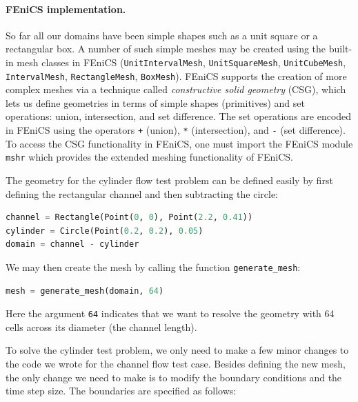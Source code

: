 \documentclass[graybox,envcountchap,sectrefs,final]{svmonodo}
\begin{document}
\paragraph{FEniCS implementation.}
So far all our domains have been simple shapes such as a unit square or
a rectangular box. A number of such simple meshes may be created
using the built-in mesh classes in FEniCS
(\texttt{UnitIntervalMesh},
\texttt{UnitSquareMesh},
\texttt{UnitCubeMesh},
\texttt{IntervalMesh},
\texttt{RectangleMesh},
\texttt{BoxMesh}).
FEniCS supports the creation of more complex meshes via a technique
called \emph{constructive solid geometry} (CSG), which lets us define
geometries in terms of simple shapes (primitives) and set operations:
union, intersection, and set difference. The set operations are
encoded in FEniCS using the operators \texttt{+} (union), \texttt{*} (intersection),
and \texttt{-} (set difference). To access the CSG functionality in FEniCS,
one must import the FEniCS module \texttt{mshr} which provides the
extended meshing functionality of FEniCS.


The geometry for the cylinder flow test problem can be defined easily
by first defining the rectangular channel and then subtracting the
circle:

\begin{lstlisting}[language=Python,style=graycolor]
channel = Rectangle(Point(0, 0), Point(2.2, 0.41))
cylinder = Circle(Point(0.2, 0.2), 0.05)
domain = channel - cylinder
\end{lstlisting}
We may then create the mesh by calling the function \Verb!generate_mesh!:

\begin{lstlisting}[language=Python,style=graycolor]
mesh = generate_mesh(domain, 64)
\end{lstlisting}
Here the argument \texttt{64} indicates that we want to resolve the geometry
with 64 cells across its diameter (the channel length).





To solve the cylinder test problem, we only need to make a few minor
changes to the code we wrote for the channel flow test
case. Besides defining the new mesh, the only change we need to make
is to modify the boundary conditions and the time step size. The
boundaries are specified as follows:
\end{document}
